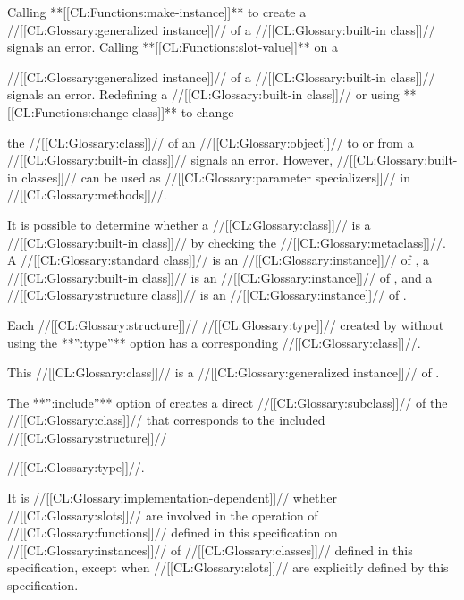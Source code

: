 Calling **[[CL:Functions:make-instance]]** to create a //[[CL:Glossary:generalized instance]]// of a 
//[[CL:Glossary:built-in class]]// signals an error.  Calling **[[CL:Functions:slot-value]]** on a

//[[CL:Glossary:generalized instance]]// of a //[[CL:Glossary:built-in class]]// signals an error.
Redefining a //[[CL:Glossary:built-in class]]// or using **[[CL:Functions:change-class]]** to change

the //[[CL:Glossary:class]]// of an //[[CL:Glossary:object]]// to or from a //[[CL:Glossary:built-in class]]// signals an error.
However, //[[CL:Glossary:built-in classes]]// can be used as //[[CL:Glossary:parameter specializers]]// 
in //[[CL:Glossary:methods]]//.
                                        





It is possible to determine whether a //[[CL:Glossary:class]]// is a //[[CL:Glossary:built-in class]]//
by checking the //[[CL:Glossary:metaclass]]//.
A //[[CL:Glossary:standard class]]//  is an //[[CL:Glossary:instance]]// of ,
a //[[CL:Glossary:built-in class]]//  is an //[[CL:Glossary:instance]]// of , and
a //[[CL:Glossary:structure class]]// is an //[[CL:Glossary:instance]]// of .
                                
Each //[[CL:Glossary:structure]]// //[[CL:Glossary:type]]// created by  without 
using the **'':type''** option has a corresponding //[[CL:Glossary:class]]//.  

This //[[CL:Glossary:class]]// is a //[[CL:Glossary:generalized instance]]// of .  





The **'':include''** option of  creates a direct
//[[CL:Glossary:subclass]]// of the //[[CL:Glossary:class]]// 
that corresponds to the included //[[CL:Glossary:structure]]// 

//[[CL:Glossary:type]]//.



It is //[[CL:Glossary:implementation-dependent]]// whether //[[CL:Glossary:slots]]// are involved in the
operation of //[[CL:Glossary:functions]]// defined in this specification
on //[[CL:Glossary:instances]]// of //[[CL:Glossary:classes]]// defined in this specification,
except when //[[CL:Glossary:slots]]// are explicitly defined by this specification.

